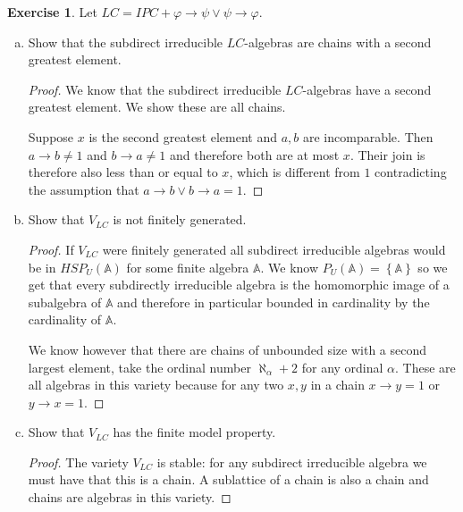 \documentclass{article}
\newcommand{\set}[1]{\left\{#1\right\}}
\theoremstyle{definition}
\newtheorem{question}{Exercise}
\begin{document}
\begin{question}
    Let \(LC=IPC+\varphi\to\psi\vee\psi\to\varphi\).

    \begin{enumerate}[a)]
        \item Show that the subdirect irreducible \(LC\)-algebras are chains
              with a second greatest element.

              \begin{proof}
                  We know that the subdirect irreducible \(LC\)-algebras have a
                  second greatest element. We show these are all chains.

                  Suppose \(x\) is the second greatest element and \(a,b\) are
                  incomparable. Then \(a\to b\neq 1\) and \(b\to a\neq 1\) and
                  therefore both are at most \(x\). Their join is therefore also
                  less than or equal to \(x\), which is different from \(1\)
                  contradicting the assumption that \(a\to b\vee b\to a=1\).
              \end{proof}

        \item Show that \(V_{LC}\) is not finitely generated.

              \begin{proof}
                  If \(V_{LC}\) were finitely generated all subdirect
                  irreducible algebras would be in \(HSP_{U}(\mathbb{A})\) for
                  some finite algebra \(\mathbb{A}\). We know
                  \(P_{U}(\mathbb{A})=\set{\mathbb{A}}\) so we get that every
                  subdirectly irreducible algebra is the homomorphic image of a
                  subalgebra of \(\mathbb{A}\) and therefore in particular
                  bounded in cardinality by the cardinality of \(\mathbb{A}\).

                  We know however that there are chains of unbounded size with a
                  second largest element, take the ordinal number
                  \(\aleph_{\alpha}+2\) for any ordinal \(\alpha\). These are
                  all algebras in this variety because for any two \(x,y\) in a
                  chain \(x\to y=1\) or \(y\to x=1\).
              \end{proof}

        \item Show that \(V_{LC}\) has the finite model property.

              \begin{proof}
                  The variety \(V_{LC}\) is stable: for any subdirect
                  irreducible algebra we must have that this is a chain. A
                  sublattice of a chain is also a chain and chains are algebras
                  in this variety.
              \end{proof}


\end{enumerate}
\end{question}
\end{document}
